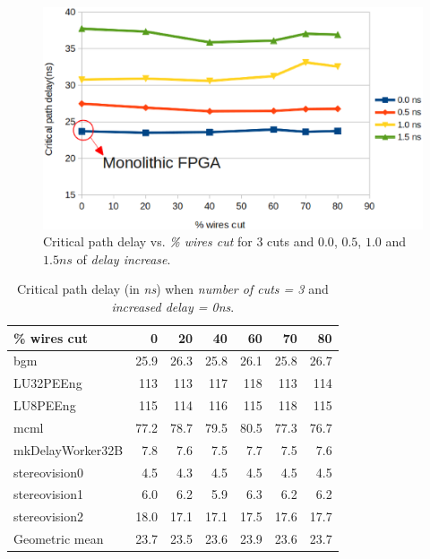 \documentclass{sig-alternate-2013}
\begin{document}
\begin{figure}[!htbp]
\centering
\includegraphics[width=\linewidth]{delays_crit_path.eps}
\caption{Critical path delay vs. \textit{\% wires cut} for 3 cuts and $0.0$, $0.5$, $1.0$ and $1.5ns$ of \textit{delay increase}.}
\label{fig:delays_crit}
\end{figure}

\begin{table}[!htbp]
\begin{tabular}{|l|r|r|r|r|r|r|}
\hline
\% wires cut & 0 & 20 & 40 & 60 & 70 & 80 \\ \hline  \hline
bgm & 25.9 & 26.3 & 25.8 & 26.1 & 25.8 & 26.7 \\ \hline
LU32PEEng & 113 & 113 & 117 & 118 & 113 & 114 \\ \hline
LU8PEEng & 115 & 114 & 116 & 115 & 118 & 115 \\ \hline
mcml & 77.2 & 78.7 & 79.5 & 80.5 & 77.3 & 76.7 \\ \hline
mkDelayWorker32B & 7.8 & 7.6 & 7.5 & 7.7 & 7.5 & 7.6 \\ \hline
stereovision0 & 4.5 & 4.3 & 4.5 & 4.5 & 4.5 & 4.5 \\ \hline
stereovision1 & 6.0 & 6.2 & 5.9 & 6.3 & 6.2 & 6.2 \\ \hline
stereovision2 & 18.0 & 17.1 & 17.1 & 17.5 & 17.6 & 17.7 \\ \hline
Geometric mean & 23.7 & 23.5 & 23.6 & 23.9 & 23.6 & 23.7 \\ \hline
\end{tabular}
\caption{Critical path delay (in \textit{ns}) when \textit{number of cuts = 3} and \textit{increased delay = 0ns}.}
\label{table:delay0}
\end{table}
\end{document}
